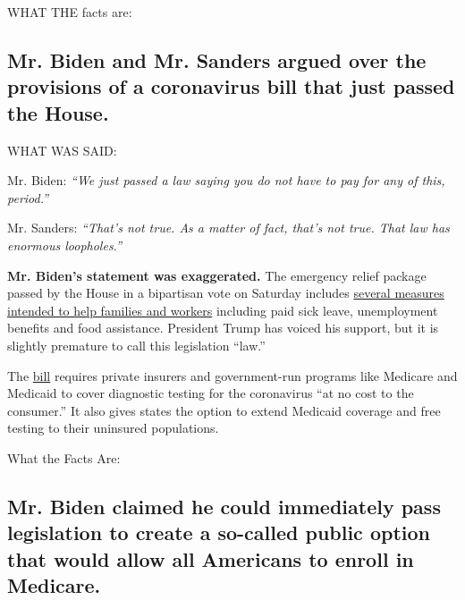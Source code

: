 WHAT THE facts are:

\hypertarget{mr-biden-and-mr-sanders-argued-over-the-provisions-of-a-coronavirus-bill-that-just-passed-the-house}{%
\subsection{Mr. Biden and Mr. Sanders argued over the provisions of a
coronavirus bill that just passed the
House.}\label{mr-biden-and-mr-sanders-argued-over-the-provisions-of-a-coronavirus-bill-that-just-passed-the-house}}

WHAT WAS SAID:

Mr. Biden: \emph{``We just passed a law saying you do not have to pay
for any of this, period.''}

Mr. Sanders: \emph{``That's not true. As a matter of fact, that's not
true. That law has enormous loopholes.''}

\textbf{Mr. Biden's statement was exaggerated.} The emergency relief
package passed by the House in a bipartisan vote on Saturday includes
\href{https://www.nytimes3xbfgragh.onion/2020/03/14/us/politics/congress-coronavirus-bill.html}{several
measures intended to help families and workers} including paid sick
leave, unemployment benefits and food assistance. President Trump has
voiced his support, but it is slightly premature to call this
legislation ``law.''

The
\href{https://appropriations.house.gov/sites/democrats.appropriations.house.gov/files/Families\%20First\%20summary.pdf\#page=7}{bill}
requires private insurers and government-run programs like Medicare and
Medicaid to cover diagnostic testing for the coronavirus ``at no cost to
the consumer.'' It also gives states the option to extend Medicaid
coverage and free testing to their uninsured populations.

What the Facts Are:

\hypertarget{mr-biden-claimed-he-could-immediately-pass-legislation-to-create-a-so-called-public-option-that-would-allow-all-americans-to-enroll-in-medicare}{%
\subsection{Mr. Biden claimed he could immediately pass legislation to
create a so-called public option that would allow all Americans to
enroll in
Medicare.}\label{mr-biden-claimed-he-could-immediately-pass-legislation-to-create-a-so-called-public-option-that-would-allow-all-americans-to-enroll-in-medicare}}

